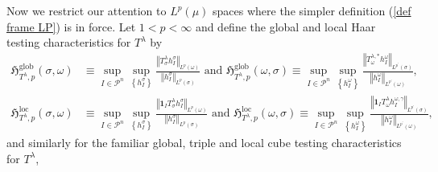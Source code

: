 \documentclass{amsart}%
\theoremstyle{plain}
\numberwithin{equation}{section}
\begin{document}
Now we restrict our attention to $L^{p}\left(  \mu\right)  $ spaces where the
simpler definition (\ref{def frame LP}) is in force. Let $1<p<\infty$ and
define the global and local Haar testing characteristics for $T^{\lambda}$ by%
\begin{align*}
\mathfrak{H}_{T^{\lambda},p}^{\operatorname*{glob}}\left(  \sigma
,\omega\right)   &  \equiv\sup_{I\in\mathcal{P}^{n}} \sup\limits_{ \left\{
h_{I} ^{\sigma} \right\}  } \frac{\left\Vert T_{\sigma}^{\lambda}h_{I}%
^{\sigma}\right\Vert _{L^{p}\left(  \omega\right)  }}{\left\Vert h_{I}%
^{\sigma}\right\Vert _{L^{p}\left(  \sigma\right)  }}\text{ and }%
\mathfrak{H}_{T^{\lambda},p}^{\operatorname*{glob}}\left(  \omega
,\sigma\right)  \equiv\sup_{I\in\mathcal{P}^{n}} \sup\limits_{ \left\{  h_{I}
^{\omega} \right\}  }\frac{\left\Vert T_{\omega}^{\lambda,\ast}h_{I}^{\omega
}\right\Vert _{L^{p^{\prime}}\left(  \sigma\right)  }}{\left\Vert
h_{I}^{\omega}\right\Vert _{L^{p^{\prime}}\left(  \omega\right)  }},\\
\mathfrak{H}_{T^{\lambda},p}^{\operatorname{loc}}\left(  \sigma,\omega\right)
&  \equiv\sup_{I\in\mathcal{P}^{n}} \sup\limits_{ \left\{  h_{I} ^{\sigma}
\right\}  }\frac{\left\Vert \mathbf{1}_{I}T_{\sigma}^{\lambda}h_{I}^{\sigma
}\right\Vert _{L^{p}\left(  \omega\right)  }}{\left\Vert h_{I}^{\sigma
}\right\Vert _{L^{p}\left(  \sigma\right)  }}\text{ and }\mathfrak{H}%
_{T^{\lambda},p}^{\operatorname{loc}}\left(  \omega,\sigma\right)  \equiv
\sup_{I\in\mathcal{P}^{n}} \sup\limits_{ \left\{  h_{I} ^{\omega} \right\}  }
\frac{\left\Vert \mathbf{1}_{I}T_{\omega}^{\lambda}h_{I}^{\omega, \gamma
}\right\Vert _{L^{p^{\prime}}\left(  \sigma\right)  }}{\left\Vert
h_{I}^{\omega}\right\Vert _{L^{p^{\prime}}\left(  \omega\right)  }},
\end{align*}
and similarly for the familiar global, triple and local cube testing
characteristics for $T^{\lambda}$,%
\end{document}
